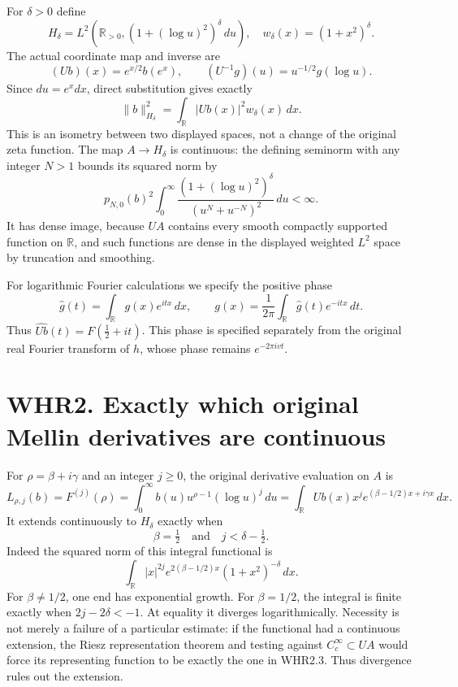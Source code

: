 For \(\delta>0\) define \[
 H_\delta=L^2\!\left(\mathbb R_{>0},
       (1+(\log u)^2)^\delta\,du\right),
 \quad w_\delta(x)=(1+x^2)^\delta.
 \tag{WHR1.4}
\] The actual coordinate map and inverse are \[
 (Ub)(x)=e^{x/2}b(e^x),\qquad
 (U^{-1}g)(u)=u^{-1/2}g(\log u).
 \tag{WHR1.5}
\] Since \(du=e^x dx\), direct substitution gives exactly \[
 \|b\|_{H_\delta}^2
 =\int_{\mathbb R}|Ub(x)|^2w_\delta(x)\,dx.
 \tag{WHR1.6}
\] This is an isometry between two displayed spaces, not a change of the
original zeta function. The map \(A\to H_\delta\) is continuous: the
defining seminorm with any integer \(N>1\) bounds its squared norm by \[
 p_{N,0}(b)^2\int_0^\infty
 \frac{(1+(\log u)^2)^\delta}{(u^N+u^{-N})^2}\,du<\infty.
\] It has dense image, because \(U A\) contains every smooth compactly
supported function on \(\mathbb R\), and such functions are dense in the
displayed weighted \(L^2\) space by truncation and smoothing.

For logarithmic Fourier calculations we specify the positive phase \[
 \widehat g(t)=\int_{\mathbb R}g(x)e^{itx}\,dx,
 \qquad g(x)=\frac1{2\pi}\int_{\mathbb R}\widehat g(t)e^{-itx}\,dt.
 \tag{WHR1.7}
\] Thus \(\widehat{Ub}(t)=F(\tfrac12+it)\). This phase is specified
separately from the original real Fourier transform of \(h\), whose
phase remains \(e^{-2\pi ivt}\).

\section{WHR2. Exactly which original Mellin derivatives are
continuous}\label{whr2.-exactly-which-original-mellin-derivatives-are-continuous}

For \(\rho=\beta+i\gamma\) and an integer \(j\geq0\), the original
derivative evaluation on \(A\) is \[
 L_{\rho,j}(b)=F^{(j)}(\rho)
 =\int_0^\infty b(u)u^{\rho-1}(\log u)^j\,du
 =\int_{\mathbb R}Ub(x)x^je^{(\beta-1/2)x+i\gamma x}\,dx.
 \tag{WHR2.1}
\] It extends continuously to \(H_\delta\) exactly when \[
 \boxed{\beta=\tfrac12\quad\text{and}\quad j<\delta-\tfrac12.}
 \tag{WHR2.2}
\] Indeed the squared norm of this integral functional is \[
 \int_{\mathbb R}|x|^{2j}e^{2(\beta-1/2)x}(1+x^2)^{-\delta}\,dx.
 \tag{WHR2.3}
\] For \(\beta\ne1/2\), one end has exponential growth. For
\(\beta=1/2\), the integral is finite exactly when \(2j-2\delta<-1\). At
equality it diverges logarithmically. Necessity is not merely a failure
of a particular estimate: if the functional had a continuous extension,
the Riesz representation theorem and testing against
\(C_c^\infty\subset U A\) would force its representing function to be
exactly the one in WHR2.3. Thus divergence rules out the extension.

